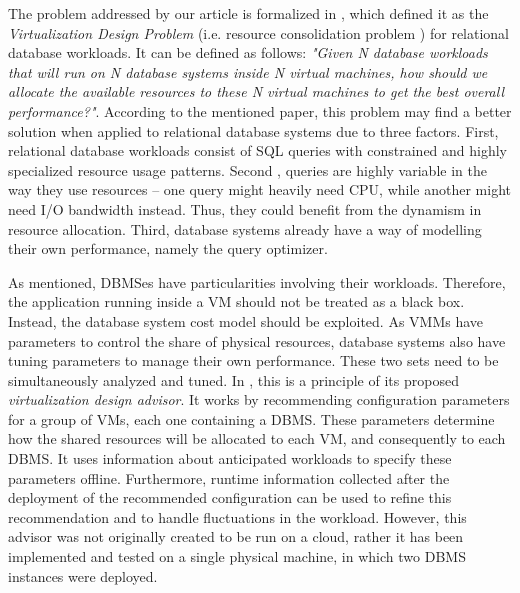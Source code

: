 \documentclass[jidm,a4paper]{jidm} %
\begin{document}
The problem addressed by our article is formalized in \cite{4401021}, which defined it as the \textit{Virtualization Design Problem} (i.e. resource consolidation problem ) for relational database workloads. It can be defined as follows: \textit{"Given N database workloads that will run on N database systems inside N virtual 
machines, how should we allocate the available resources to these N virtual machines to get the best overall performance?"}. According to the mentioned paper, this problem may find a better solution when applied to relational database systems due to three factors. First, relational database workloads consist of SQL queries with constrained and highly specialized resource usage patterns. Second , queries are highly variable in the way they use resources -- one query might heavily need CPU, while another might need I/O bandwidth instead. Thus, they could benefit from the dynamism in resource allocation. Third, database systems already have a way of modelling their own performance, namely the query optimizer.

As mentioned, DBMSes have particularities involving their workloads. Therefore, the application running inside a VM should not be treated as a black box. Instead, the database system cost model should be exploited. As VMMs have parameters to control the share of physical resources, database systems also have tuning parameters to manage their own performance. These two sets need to be simultaneously analyzed and tuned. In \cite{Soror:2008:AVM:1376616.1376711}, this is a principle of its proposed \textit{virtualization design advisor}. It works by recommending configuration parameters for a group of VMs, each one containing a DBMS. These parameters determine how the shared resources will be allocated to each VM, and consequently to each DBMS. It uses information about anticipated workloads to specify these parameters offline. Furthermore, runtime information collected after the deployment of the recommended configuration can be used to refine this recommendation and to handle fluctuations in the workload. However, this advisor was not originally created to be run on a cloud, rather it has been implemented and tested on a single physical machine, in which two DBMS instances were deployed.
\end{document}
